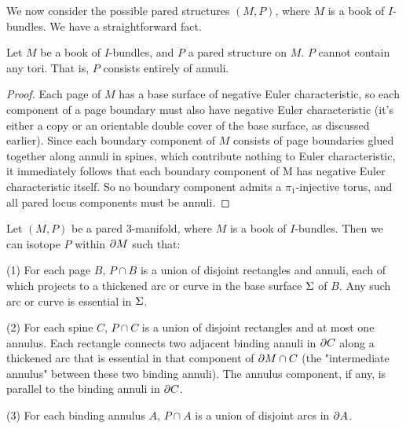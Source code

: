 We now consider the possible pared structures $(M,P)$, where $M$ is a book of
$I$-bundles. We have a straightforward fact.

\begin{prop}\label{P:annuli}

Let $M$ be a book of $I$-bundles, and $P$ a pared structure on $M$. $P$ cannot
contain any tori.  That is, $P$ consists entirely of annuli.

\end{prop}

\begin{proof}

Each page of $M$ has a base surface of negative Euler characteristic, so each
component of a page boundary must also have negative Euler characteristic (it's
either a copy or an orientable double cover of the base surface, as discussed
earlier). Since each boundary component of $M$ consists of page boundaries
glued together along annuli in spines, which contribute nothing to Euler
characteristic, it immediately follows that each boundary component of M has
negative Euler characteristic itself. So no boundary component admits
a $\pi_1$-injective torus, and all pared locus components must be annuli.

\end{proof}

\begin{lemma}

Let $(M,P)$ be a pared 3-manifold, where $M$ is a book of $I$-bundles. Then we
can isotope $P$ within $\partial M$ such that:

(1) For each page $B$, $P \cap B$ is a union of disjoint rectangles and annuli,
each of which projects to a thickened arc or curve in the base surface $\Sigma$ of
$B$.  Any such arc or curve is essential in $\Sigma$.

(2) For each spine $C$, $P \cap C$ is a union of disjoint rectangles and at
most one annulus.  Each rectangle connects two adjacent binding annuli in $\partial
C$ along a thickened arc that is essential in that component of $\partial M \cap C$
(the "intermediate annulus" between these two binding annuli). The annulus
component, if any, is parallel to the binding annuli in $\partial C$.

(3) For each binding annulus $A$, $P \cap A$ is a union of disjoint arcs in
$\partial A$.

\end{lemma}

